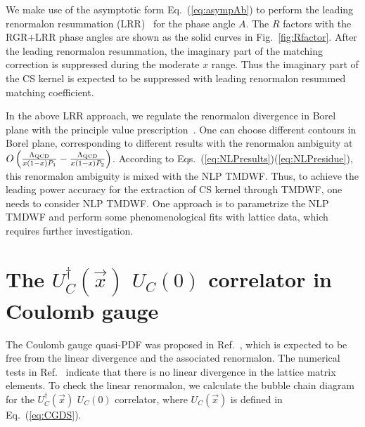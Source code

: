 \documentclass[a4paper,11pt]{article}
\begin{document}
We make use of the asymptotic form Eq.~(\ref{eq:asympAb}) to perform the leading renormalon resummation (LRR)~\cite{Zhang:2023bxs} for the phase angle $A$. The $R$ factors with the RGR+LRR phase angles are shown as the solid curves in Fig.~\ref{fig:Rfactor}. After the leading renormalon resummation, the imaginary part of the matching correction is suppressed during the moderate $x$ range. Thus the imaginary part of the CS kernel is expected to be suppressed with leading renormalon resummed matching coefficient. 

In the above LRR approach, we regulate the renormalon divergence in Borel plane with the principle value prescription~\cite{Cvetic:2002qf}. One can choose different contours in Borel plane, corresponding to different results with the renormalon ambiguity at $O\left( \frac{\Lambda_{\rm QCD}}{x (1-x) P_1}-\frac{\Lambda_{\rm QCD}}{x (1-x) P_2} \right)$. According to Eqs.~(\ref{eq:NLPresults})(\ref{eq:NLPresidue}), this renormalon ambiguity is mixed with the NLP TMDWF. Thus, to achieve the leading power accuracy for the extraction of CS kernel through TMDWF, one needs to consider NLP TMDWF. One approach is to parametrize the NLP TMDWF and perform some phenomenological fits with lattice data, which requires further investigation. 


\section{The $U_{C}^{\dagger}(\vec{x})$ $U_{C}(0)$ correlator in Coulomb gauge}
The Coulomb gauge quasi-PDF was proposed in Ref.~\cite{Gao:2023lny}, which is expected to be free from the linear divergence and the associated renormalon. The numerical tests in Ref.~\cite{Gao:2023lny} indicate that there is no linear divergence in the lattice matrix elements. To check the linear renormalon, we calculate the bubble chain diagram for the $U_{C}^{\dagger}(\vec{x})$ $U_{C}(0)$ correlator, where $U_{C}(\vec{x})$ is defined in Eq.~(\ref{eq:CGDS}).
\end{document}
